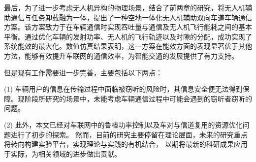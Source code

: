 最后，为了进一步考虑无人机异构的物理场景，结合了前两章的研究，将无人机辅助通信与任务卸载融为一体，提出了一种空地一体化无人机辅助双向车道车辆通信方案。该方案致力于在车辆通信时实现吞吐量与通信及无人机飞行能耗之间的基本平衡。通过优化车辆的发射功率、无人机的飞行轨迹以及时隙的分配，成功实现了系统能效的最大化。数值仿真结果表明，这一方案在能效方面的表现显著优于其他方法，能够有效提升车联网的通信效率，为智能交通的发展提供了有力支持。

但是现有工作需要进一步完善，主要包括以下两点：

(1) 车辆用户的信息在传输过程中面临被窃听的风险时，其信息安全便无法得到保障。现阶段所研究的场景中，未能考虑车辆通信过程中可能会遇到的窃听者窃听的问题。


(2) 此外，本文已经对车联网中的鲁棒功率控制以及车对与信道复用的资源优化问题进行了初步的探索。
然而，目前的研究主要停留在理论层面，未来的研究重点将转向构建实验平台，实现理论与实践的有机结合，
以期将最新的科研成果应用于实际，为相关领域的进步做出贡献。
